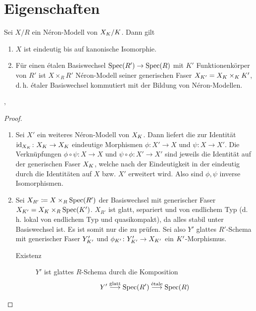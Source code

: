 \documentclass[german]{scrreprt}
\begin{document}

\section{Eigenschaften}
\begin{Satz}
  Sei $X/R$ ein Néron-Modell von $X_{K}/K$. Dann gilt
  \begin{enumerate}[label=(\roman*)]
  \item $X$ ist eindeutig bis auf kanonische Isomorphie.
  \item Für einen étalen Basiswechsel $\operatorname{Spec}(R')\to\operatorname{Spec}(R)$ mit $K'$
    Funktionenkörper von $R'$ ist $X\times_R R'$ Néron-Modell
    seiner generischen Faser $X_{K'}=X_{K}\times_{K}K'$,
    d.\,h. étaler Basiswechsel kommutiert mit der Bildung von
    Néron-Modellen.
  \end{enumerate}
  \cite[1.2, Proposition 2]{neron},
  \cite[vgl.][Proposition IV.5.2]{silverman2}
  \begin{proof}
    \begin{enumerate}[label=(\roman*)]
    \item Sei $X'$ ein weiteres Néron-Modell von $X_{K}$.
      Dann liefert die \NAbbEig zur Identität
      $\mathrm{id}_{X_{K}}\colon X_{K}\to X_{K}$ eindeutige Morphismen
      $\phi\colon X'\to X$ und $\psi\colon X\to X'$.
      Die Verknüpfungen $\phi\circ\psi\colon X\to X$ und
      $\psi\circ\phi\colon X'\to X'$ sind jeweils die Identität auf
      der generischen Faser $X_{K}$, welche nach der Eindeutigkeit in der
      \NAbbEig eindeutig durch die Identitäten auf
      $X$ bzw. $X'$ erweitert wird. Also sind $\phi,\psi$ inverse
      Isomorphismen.
    \item
      Sei $X_{R'}\coloneqq X\times_R \operatorname{Spec}(R')$ der Basiswechsel
      mit generischer Faser $X_{K'}=X_{K}\times_R\operatorname{Spec}(K')$. $X_{R'}$
      ist glatt, separiert und von endlichem Typ 
      (d.\,h. lokal von endlichem Typ und quasikompakt), da alles
      stabil unter Basiswechsel ist. Es ist somit nur die
      \NAbbEig zu prüfen.
      Sei also $Y'$ glattes $R'$-Schema mit generischer Faser
      $Y_{K'}'$ und $\phi_{K'}\colon Y_{K'}'\to X_{K'}$ ein
      $K'$-Morphismus. 
      \begin{description}
      \item[Existenz] 
        $Y'$ ist glattes $R$-Schema durch die Komposition
        \begin{gather*}
          Y'\overset{\text{glatt}}\longto\Spec(R')
          \overset{\text{étale}}\longto\Spec(R)

\end{gather*}
\end{description}
\end{enumerate}
\end{proof}
\end{Satz}
\end{document}

